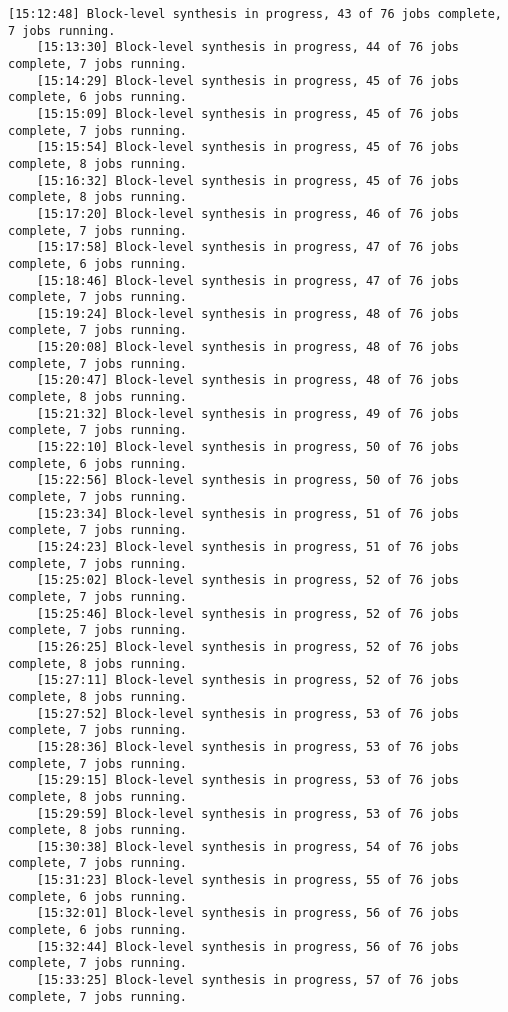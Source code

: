 \begin{lstlisting}[caption=Содержимое файла v++\_vinc.log, label={log1}]
	[15:12:48] Block-level synthesis in progress, 43 of 76 jobs complete, 7 jobs running.
	[15:13:30] Block-level synthesis in progress, 44 of 76 jobs complete, 7 jobs running.
	[15:14:29] Block-level synthesis in progress, 45 of 76 jobs complete, 6 jobs running.
	[15:15:09] Block-level synthesis in progress, 45 of 76 jobs complete, 7 jobs running.
	[15:15:54] Block-level synthesis in progress, 45 of 76 jobs complete, 8 jobs running.
	[15:16:32] Block-level synthesis in progress, 45 of 76 jobs complete, 8 jobs running.
	[15:17:20] Block-level synthesis in progress, 46 of 76 jobs complete, 7 jobs running.
	[15:17:58] Block-level synthesis in progress, 47 of 76 jobs complete, 6 jobs running.
	[15:18:46] Block-level synthesis in progress, 47 of 76 jobs complete, 7 jobs running.
	[15:19:24] Block-level synthesis in progress, 48 of 76 jobs complete, 7 jobs running.
	[15:20:08] Block-level synthesis in progress, 48 of 76 jobs complete, 7 jobs running.
	[15:20:47] Block-level synthesis in progress, 48 of 76 jobs complete, 8 jobs running.
	[15:21:32] Block-level synthesis in progress, 49 of 76 jobs complete, 7 jobs running.
	[15:22:10] Block-level synthesis in progress, 50 of 76 jobs complete, 6 jobs running.
	[15:22:56] Block-level synthesis in progress, 50 of 76 jobs complete, 7 jobs running.
	[15:23:34] Block-level synthesis in progress, 51 of 76 jobs complete, 7 jobs running.
	[15:24:23] Block-level synthesis in progress, 51 of 76 jobs complete, 7 jobs running.
	[15:25:02] Block-level synthesis in progress, 52 of 76 jobs complete, 7 jobs running.
	[15:25:46] Block-level synthesis in progress, 52 of 76 jobs complete, 7 jobs running.
	[15:26:25] Block-level synthesis in progress, 52 of 76 jobs complete, 8 jobs running.
	[15:27:11] Block-level synthesis in progress, 52 of 76 jobs complete, 8 jobs running.
	[15:27:52] Block-level synthesis in progress, 53 of 76 jobs complete, 7 jobs running.
	[15:28:36] Block-level synthesis in progress, 53 of 76 jobs complete, 7 jobs running.
	[15:29:15] Block-level synthesis in progress, 53 of 76 jobs complete, 8 jobs running.
	[15:29:59] Block-level synthesis in progress, 53 of 76 jobs complete, 8 jobs running.
	[15:30:38] Block-level synthesis in progress, 54 of 76 jobs complete, 7 jobs running.
	[15:31:23] Block-level synthesis in progress, 55 of 76 jobs complete, 6 jobs running.
	[15:32:01] Block-level synthesis in progress, 56 of 76 jobs complete, 6 jobs running.
	[15:32:44] Block-level synthesis in progress, 56 of 76 jobs complete, 7 jobs running.
	[15:33:25] Block-level synthesis in progress, 57 of 76 jobs complete, 7 jobs running.

\end{lstlisting}
